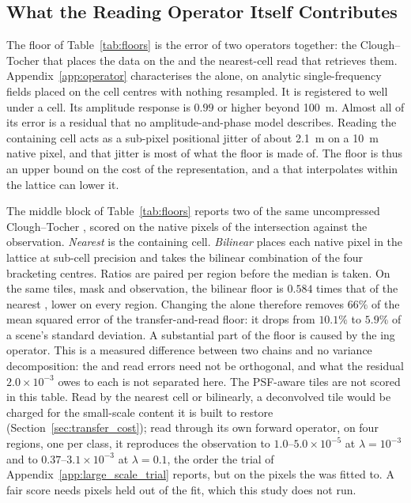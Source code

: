 \subsection{What the Reading Operator Itself Contributes}
\label{sec:operator}

The floor of Table~\ref{tab:floors} is the error of two operators
together: the Clough--Tocher  that places the data on the 
and the nearest-cell read that retrieves them. Appendix~\ref{app:operator}
characterises the  alone, on analytic single-frequency fields placed
on the cell centres with nothing resampled. It is registered to well
under a cell. Its amplitude response is $0.99$ or higher beyond
\SI{100}{m}. Almost all of its error is a residual that no
amplitude-and-phase model describes. Reading the containing cell acts as
a sub-pixel positional jitter of about \SI{2.1}{m} on a \SI{10}{m} native
pixel, and that jitter is most of what the floor is made of. The floor is
thus an upper bound on the cost of the representation, and a  that
interpolates within the  lattice can lower it.

The middle block of Table~\ref{tab:floors} reports two  of the
same uncompressed Clough--Tocher , scored on the native pixels of
the intersection against the observation. \emph{Nearest} is the
containing cell. \emph{Bilinear} places each native pixel in the 
lattice at sub-cell precision and takes the bilinear combination of the
four bracketing centres. Ratios are paired per region before the median
is taken. On the same tiles, mask and observation, the bilinear floor is
$0.584$ times that of the nearest , lower on every region. Changing
the  alone therefore removes $66\%$ of the mean squared error of the
transfer-and-read floor: it drops from $10.1\%$ to $5.9\%$ of a scene's
standard deviation. A substantial part of the floor is caused by the
ing operator. This is a measured difference between two chains and no
variance decomposition: the  and read errors need not be
orthogonal, and what the residual $2.0\times10^{-3}$ owes to each is not
separated here. The PSF-aware tiles are not scored in this table. Read by the nearest
cell or bilinearly, a deconvolved tile would be charged for the
small-scale content it is built to restore
(Section~\ref{sec:transfer_cost}); read through its own forward
operator, on four regions, one per class, it reproduces the observation to
$1.0$--$5.0\times10^{-5}$ at $\lambda=10^{-3}$ and to
$0.37$--$3.1\times10^{-3}$ at $\lambda=0.1$, the order the trial of
Appendix~\ref{app:large_scale_trial} reports, but on the pixels the
 was fitted to. A fair score needs pixels held out of the
fit, which this study does not run.

